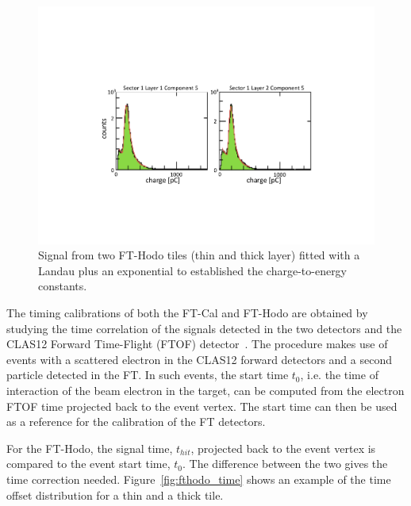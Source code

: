\begin{figure}
\includegraphics[width=1.0\columnwidth]{fig/fthodo_mips.pdf}
\caption{Signal from two FT-Hodo tiles (thin and thick layer) fitted with a Landau plus an exponential to established
  the charge-to-energy constants.}
\label{fig:fthodo_mips}
\end{figure}

The timing calibrations of both the FT-Cal and FT-Hodo are obtained by studying the time correlation of the signals
detected in the two detectors and the CLAS12 Forward Time-Flight (FTOF) detector~\cite{ftof}. The procedure makes use of events with a
scattered electron in the CLAS12 forward detectors and a second particle detected in the FT. In
such events, the start time $t_0$, i.e. the time of interaction of the beam electron in the target, can be computed
from the electron FTOF time projected back to the event vertex. The start time can then be used as a reference
for the calibration of the FT detectors. 

For the FT-Hodo, the signal time, $t_{hit}$, projected back to the event vertex is compared to the event start time,
$t_0$. The difference between the two gives the time correction needed. Figure~\ref{fig:fthodo_time} shows an
example of the time offset distribution for a thin and a thick tile.

